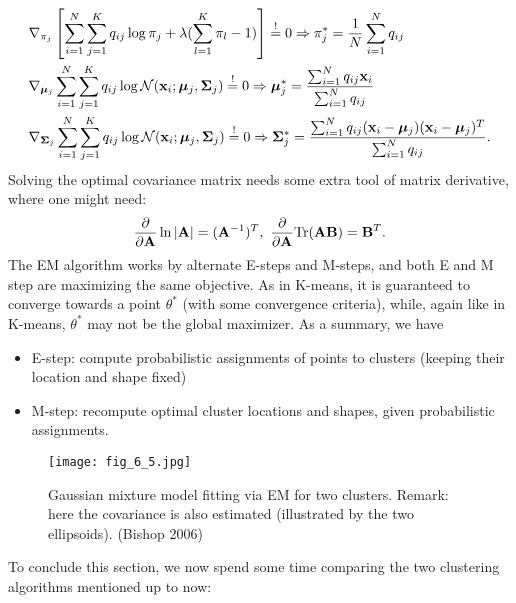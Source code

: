 \documentclass[../main.tex]{subfiles}
\begin{document}
\begin{align*}
&\nabla_{\pi_j}\left[\sum_{i=1}^{N}\sum_{j=1}^{K}q_{ij}\log \pi_j +\lambda(\sum_{l=1}^{K} \pi_l-1)\right]\overset{!}{=}0\Rightarrow \pi_j^* =\frac{1}{N}\sum_{i=1}^{N}q_{ij}\\
&\nabla_{\bm{\mu}_j}\sum_{i=1}^{N}\sum_{j=1}^{K}q_{ij}\log \mathcal{N}({\bf x}_i;\bm{\mu}_j,{\bf \Sigma}_j) \overset{!}{=}0\Rightarrow \bm{\mu}_j^*=\frac{\sum_{i=1}^{N}q_{ij}{\bf x}_i}{\sum_{i=1}^{N}q_{ij}}\\
&\nabla_{\bm{\Sigma}_j}\sum_{i=1}^{N}\sum_{j=1}^{K}q_{ij}\log \mathcal{N}({\bf x}_i;\bm{\mu}_j,{\bf \Sigma}_j) \overset{!}{=}0\Rightarrow \bm{\Sigma}_j^*=\frac{\sum_{i=1}^{N}q_{ij}({\bf x}_i-\bm{\mu}_j)({\bf x}_i-\bm{\mu}_j)^T}{\sum_{i=1}^{N}q_{ij}}.
\end{align*}
Solving the optimal covariance matrix needs some extra tool of matrix derivative, where one might need:
\begin{equation*}
\frac{\partial}{\partial {\bf A}}\ln |{\bf A}|=({\bf A}^{-1})^T,\ \frac{\partial}{\partial {\bf A}} {\rm Tr}({\bf AB})={\bf B}^T.
\end{equation*}
The EM algorithm works by alternate E-steps and M-steps, and both E and M step are maximizing the same objective. As in K-means, it is guaranteed to converge towards a point $\theta^*$ (with some convergence criteria), while, again like in K-means, $\theta^*$ may not be the global maximizer. As a summary, we have
\begin{itemize}
	\item E-step: compute probabilistic assignments of points to clusters (keeping their location and shape fixed)
	\item M-step: recompute optimal cluster locations and shapes, given probabilistic assignments.
\end{itemize}
\begin{figure}[h] 
	\centering 
	\texttt{[image: fig\_6\_5.jpg]} 
	\caption{Gaussian mixture model fitting via EM for two clusters. Remark: here the covariance is also estimated (illustrated by the two ellipsoids). (Bishop 2006)}\label{fig_6_5}
\end{figure}
To conclude this section, we now spend some time comparing the two clustering algorithms mentioned up to now:
\end{document}

